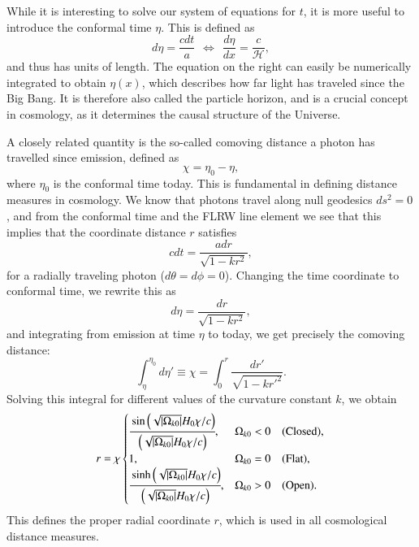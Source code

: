 \documentclass{aa}
\begin{document}
While it is interesting to solve our system of equations for $t$, it is more useful to introduce the conformal time $\eta$. This is defined as
\begin{equation}
d\eta = \frac{cdt}{a} \hspace{5pt}\Leftrightarrow\hspace{5pt}\frac{d\eta}{dx} = \frac{c}{\mathcal{H}},
\end{equation}
and thus has units of length. The equation on the right can easily be numerically integrated to obtain $\eta(x)$, which describes how far light has traveled since the Big Bang. It is therefore also called the particle horizon, and is a crucial concept in cosmology, as it determines the causal structure of the Universe. 


A closely related quantity is the so-called comoving distance a photon has travelled since emission, defined as
\begin{equation}
  \chi = \eta_0 - \eta,
\end{equation}
where $\eta_0$ is the conformal time today. This is fundamental in defining distance measures in cosmology. We know that photons travel along null geodesics $ds^2 = 0$, and from the conformal time and the FLRW line element we see that this implies that the coordinate distance $r$ satisfies
\begin{equation}
  c dt = \frac{adr}{\sqrt{1 - k r^2}},
\end{equation}
for a radially traveling photon ($d\theta = d\phi = 0$). Changing the time coordinate to conformal time, we rewrite this as
\begin{equation}
  d\eta = \frac{dr}{\sqrt{1 - k r^2}},
\end{equation}
and integrating from emission at time $\eta$ to today, we get precisely the comoving distance:
\begin{equation}
  \int_{\eta}^{\eta_0}  d\eta' \equiv \chi = \int_{0}^{r} \frac{dr'}{\sqrt{1 - k r'^2}}.
\end{equation}
Solving this integral for different values of the curvature constant $k$, we obtain
\begin{equation}
  r = 
  \chi\begin{cases}
  \cfrac{\sin\left(\sqrt{|\Omega_{k0}|} H_0 \chi / c\right)}{\left(\sqrt{|\Omega_{k0}|} H_0 \chi / c\right)}, & \Omega_{k0} < 0 \quad \text{(Closed)}, \\
1, & \Omega_{k0} = 0 \quad \text{(Flat)}, \\
\cfrac{\sinh\left(\sqrt{|\Omega_{k0}|} H_0 \chi / c\right)}{\left(\sqrt{|\Omega_{k0}|} H_0 \chi / c\right)}, & \Omega_{k0} > 0 \quad \text{(Open)}.
\end{cases}
\end{equation}
This defines the proper radial coordinate $r$, which is used in all cosmological distance measures. 
\end{document}

